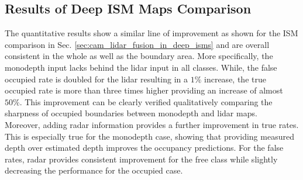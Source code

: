 \subsection{Results of Deep ISM Maps Comparison}
\label{subsec:results_analyze_deep_ism_maps_diff_sensors}
The quantitative results show a similar line of improvement as shown for the ISM comparison in Sec. \ref{sec:cam_lidar_fusion_in_deep_isms} and are overall consistent in the whole as well as the boundary area. More specifically, the \gls{monodepth} input lacks behind the lidar input in all classes. While, the false occupied rate is doubled for the lidar resulting in a $1\%$ increase, the true occupied rate is more than three times higher providing an increase of almost $50\%$. This improvement can be clearly verified qualitatively comparing the sharpness of occupied boundaries between \gls{monodepth} and lidar maps.\\
Moreover, adding radar information provides a further improvement in true rates. This is especially true for the \gls{monodepth} case, showing that providing measured depth over estimated depth improves the occupancy predictions. For the false rates, radar provides consistent improvement for the free class while slightly decreasing the performance for the occupied case.
 
